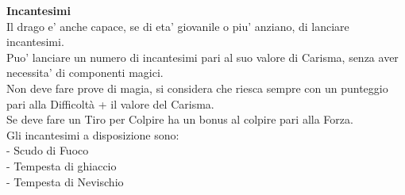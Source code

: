 \begin{multicols}{2}
\textbf{Incantesimi}\\
Il drago e' anche capace, se di eta' giovanile o piu' anziano, di lanciare incantesimi.\\
Puo' lanciare un numero di incantesimi pari al suo valore di Carisma, senza aver necessita' di componenti magici.\\
Non deve fare prove di magia, si considera che riesca sempre con un punteggio pari alla Difficoltà + il valore del Carisma.\\
Se deve fare un Tiro per Colpire ha un bonus al colpire pari alla Forza.\\
Gli incantesimi a disposizione sono:\\
- Scudo di Fuoco\\
- Tempesta di ghiaccio\\
- Tempesta di Nevischio\\




\end{multicols}
